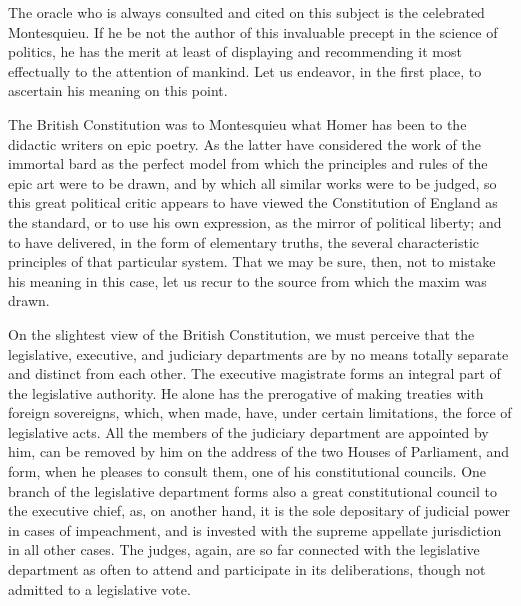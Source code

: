 The oracle who is always consulted and cited on this subject is the celebrated Montesquieu. 
If he be not the author of this invaluable precept in the science of politics, he has the merit at least of displaying and recommending it most effectually to the attention of mankind. 
Let us endeavor, in the first place, to ascertain his meaning on this point.

The British Constitution was to Montesquieu what Homer has been to the didactic writers on epic poetry. 
As the latter have considered the work of the immortal bard as the perfect model from which the principles and rules of the epic art were to be drawn, and by which all similar works were to be judged, so this great political critic appears to have viewed the Constitution of England as the standard, or to use his own expression, as the mirror of political liberty; and to have delivered, in the form of elementary truths, the several characteristic principles of that particular system. 
That we may be sure, then, not to mistake his meaning in this case, let us recur to the source from which the maxim was drawn.

On the slightest view of the British Constitution, we must perceive that the legislative, executive, and judiciary departments are by no means totally separate and distinct from each other. 
The executive magistrate forms an integral part of the legislative authority. 
He alone has the prerogative of making treaties with foreign sovereigns, which, when made, have, under certain limitations, the force of legislative acts. 
All the members of the judiciary department are appointed by him, can be removed by him on the address of the two Houses of Parliament, and form, when he pleases to consult them, one of his constitutional councils. 
One branch of the legislative department forms also a great constitutional council to the executive chief, as, on another hand, it is the sole depositary of judicial power in cases of impeachment, and is invested with the supreme appellate jurisdiction in all other cases. 
The judges, again, are so far connected with the legislative department as often to attend and participate in its deliberations, though not admitted to a legislative vote.

